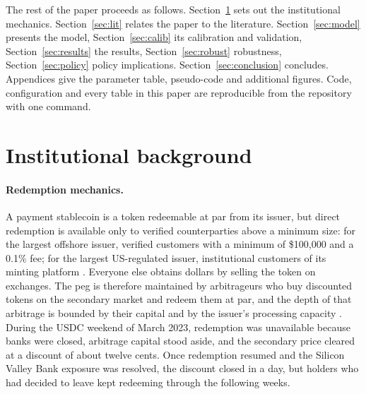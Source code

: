 The rest of the paper proceeds as follows. Section~\ref{sec:background} sets out the institutional mechanics.
Section~\ref{sec:lit} relates the paper to the literature. Section~\ref{sec:model} presents the model,
Section~\ref{sec:calib} its calibration and validation, Section~\ref{sec:results} the results,
Section~\ref{sec:robust} robustness, Section~\ref{sec:policy} policy implications. Section~\ref{sec:conclusion}
concludes. Appendices give the parameter table, pseudo-code and additional figures. Code, configuration and every
table in this paper are reproducible from the repository with one command.

\section{Institutional background}\label{sec:background}

\paragraph{Redemption mechanics.} A payment stablecoin is a token redeemable at par from its issuer, but direct
redemption is available only to verified counterparties above a minimum size: for the largest offshore issuer,
verified customers with a minimum of \$100,000 and a 0.1\% fee; for the largest US-regulated issuer, institutional
customers of its minting platform \citep{tether_attest,circle_reserve}. Everyone else obtains dollars by selling the
token on exchanges. The peg is therefore maintained by arbitrageurs who buy discounted tokens on the secondary
market and redeem them at par, and the depth of that arbitrage is bounded by their capital and by the issuer's
processing capacity \citep{ma2023,lyons2023}. During the USDC weekend of March 2023, redemption was unavailable
because banks were closed, arbitrage capital stood aside, and the secondary price cleared at a discount of about
twelve cents. Once redemption resumed and the Silicon Valley Bank exposure was resolved, the discount closed in a
day, but holders who had decided to leave kept redeeming through the following weeks.


